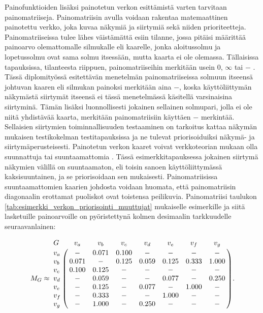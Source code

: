  Painofunktioiden lisäksi painotetun verkon esittämistä varten tarvitaan painomatriiseja.
  Painomatriisin avulla voidaan rakentaa matemaattinen painotettu verkko, joka kuvaa näkymiä ja siirtymiä sekä niiden prioriteetteja.
  Painomatriiseissa tulee lähes väistämättä esiin tilanne, jossa pitäisi määrittää painoarvo olemattomalle silmukalle eli kaarelle, jonka aloitussolmu ja lopetussolmu ovat sama solmu itsessään, mutta kaarta ei ole olemassa.
  Tällaisissa tapauksissa, tilanteesta riippuen, painomatriiseihin merkitään usein \(0\), \(\infty\) tai \(-\) \cite{graph_theory_concepts_1}.
  Tässä diplomityössä esitettävän menetelmän painomatriiseissa solmuun itseensä johtuvan kaaren eli silmukan painoksi merkitään aina \(-\), koska käyttöliittymän näkymästä siirtymät itseensä ei tässä menetelmässä käsitellä varsinaisina siirtyminä.
  Tämän lisäksi luonnollisesti jokainen sellainen solmupari, jolla ei ole niitä yhdistävää kaarta, merkitään painomatriisiin käyttäen \(-\) merkintää.
  Sellaisien siirtymien toiminnallisuuden testaaminen on tarkoitus kattaa näkymän mukaisen testikokelman testitapauksissa ja ne tulevat priorisoiduiksi näkymä- ja siirtymäperusteisesti.
  Painotetun verkon kaaret voivat verkkoteorian mukaan olla suunnattuja tai suuntaamattomia \cite{graph_theory_concepts_1}.
  Tässä esimerkkitapauksessa jokainen siirtymä näkymien välillä on suuntaamaton, eli toisin sanoen käyttöliittymässä kaksisuuntainen, ja se priorisoidaan sen mukaisesti.
  Painomatriisissa suuntaamattomien kaarien johdosta voidaan huomata, että painomatriisin diagonaalin erottamat puoliskot ovat toistensa peilikuvia.
  Painomatriisi taulukon \ref{tab:esimerkki_verkon_priorisointi_muuttujat} mukaiselle esimerkille ja siitä lasketuille painoarvoille on pyöristettynä kolmen desimaalin tarkkuudelle seuraavanlainen:

  \begin{equation} \label{eq:5_5_2}
    M_G \approx
    \bordermatrix{
      G   & v_a   & v_b   & v_c   & v_d   & v_e   & v_f   & v_g   \cr
      v_a & -     & 0.071 & 0.100 & -     & -     & -     & -     \cr
      v_b & 0.071 & -     & 0.125 & 0.059 & 0.125 & 0.333 & 1.000 \cr
      v_c & 0.100 & 0.125 & -     & -     & -     & -     & -     \cr
      v_d & -     & 0.059 & -     & -     & 0.077 & -     & 0.250 \cr
      v_e & -     & 0.125 & -     & 0.077 & -     & 1.000 & -     \cr
      v_f & -     & 0.333 & -     & -     & 1.000 & -     & -     \cr
      v_g & -     & 1.000 & -     & 0.250 & -     & -     & -     \cr
    }
    \text{.}
  \end{equation}

